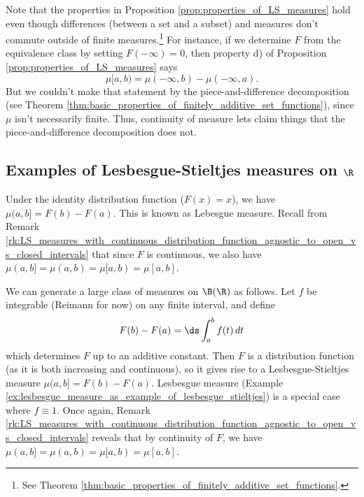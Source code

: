 \documentclass{article} %
\begin{document}
\begin{remark}
Note that the properties in Proposition \ref{prop:properties_of_LS_measures} hold even though differences (between a set and a subset) and measures don't commute outside of finite measures.\footnote{See Theorem \ref{thm:basic_properties_of_finitely_additive_set_functions}.}  For instance, if we determine $F$ from the equivalence class by setting $F(-\infty)=0$, then property d) of Proposition \ref{prop:properties_of_LS_measures} says 
\[  \mu[a,b) = \mu(-\infty, b) - \mu(-\infty, a).\]
But we couldn't make that statement by the piece-and-difference decomposition (see Theorem \ref{thm:basic_properties_of_finitely_additive_set_functions}), since $\mu$ isn't necessarily finite.  Thus, continuity of measure lets claim things that the piece-and-difference decomposition does not.
\end{remark}



\subsection{Examples of Lesbesgue-Stieltjes measures on $\R$}

\begin{example}{}
Under the identity distribution function ($F(x)=x$), we have $\mu(a,b]=F(b)-F(a)$.  This is known as Lebesgue measure.  Recall from Remark \ref{rk:LS_measures_with_continuous_distribution_function_agnostic_to_open_vs_closed_intervals} that since $F$ is continuous, we also have $\mu(a,b]=\mu(a,b)=\mu[a,b)=\mu[a,b]$.
\label{ex:lesbesgue_measure_as_example_of_lesbesgue_stieltjes} 
\end{example}

\begin{example}{}
We can generate a large class of measures on $\B(\R)$ as follows.  Let $f$ be integrable (Reimann for now) on any finite interval, and define
\[ F(b) - F(a) = \ds\int_{a}^b f(t) \, dt\]
which determines $F$ up to an additive constant.   Then $F$ is a distribution function (as it is both increasing and continuous), so it gives rise to a Lesbesgue-Stieltjes measure $\mu(a,b] = F(b) - F(a)$.  Lesbesgue measure (Example \ref{ex:lesbesgue_measure_as_example_of_lesbesgue_stieltjes}) is a special case where $f \equiv 1$.  Once again, Remark \ref{rk:LS_measures_with_continuous_distribution_function_agnostic_to_open_vs_closed_intervals} reveals that by continuity of $F$, we have $\mu(a,b]=\mu(a,b)=\mu[a,b)=\mu[a,b]$.  
\end{example}
\end{document}
